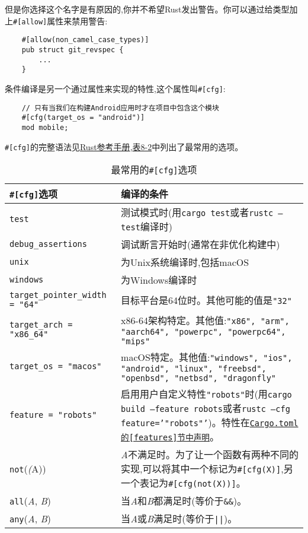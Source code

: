 但是你选择这个名字是有原因的,你并不希望Rust发出警告。你可以通过给类型加上\texttt{\#[allow]}属性来禁用警告:
\begin{verbatim}
    #[allow(non_camel_case_types)]
    pub struct git_revspec {
        ...
    }
\end{verbatim}

条件编译是另一个通过属性来实现的特性,这个属性叫\texttt{\#[cfg]}:
\begin{verbatim}
    // 只有当我们在构建Android应用时才在项目中包含这个模块
    #[cfg(target_os = "android")]
    mod mobile;
\end{verbatim}

\texttt{\#[cfg]}的完整语法见\href{https://doc.rust-lang.org/reference/conditional-compilation.html}{Rust参考手册},\hyperref[t8-2]{表8-2}中列出了最常用的选项。

\begin{table}[htbp]
    \centering
    \caption{最常用的\texttt{\#[cfg]}选项}
    \label{t8-2}
    \begin{tabular}{p{}p{}}
        \hline
        \textbf{\texttt{\#[cfg]}选项}   & \textbf{编译的条件} \\
        \hline
        \texttt{test}   & 测试模式时(用\texttt{cargo test}或者\texttt{rustc --test}编译时) \\
        \rowcolor{tablecolor}
        \texttt{debug\_assertions} & 调试断言开始时(通常在非优化构建中) \\
        \texttt{unix}   & 为Unix系统编译时,包括macOS \\
        \rowcolor{tablecolor}
        \texttt{windows}& 为Windows编译时 \\
        \texttt{target\_pointer\_width = "64"} & 目标平台是64位时。其他可能的值是\texttt{"32"} \\
        \rowcolor{tablecolor}
        \texttt{target\_arch = "x86\_64"} & x86-64架构特定。其他值:\texttt{"x86", "arm", "aarch64", "powerpc", "powerpc64", "mips"} \\
        \texttt{target\_os = "macos"} & macOS特定。其他值:\texttt{"windows", "ios", "android", "linux", "freebsd", "openbsd", "netbsd", "dragonfly"} \\
        \rowcolor{tablecolor}
        \texttt{feature = "robots"} & 启用用户自定义特性\texttt{"robots"}时(用\texttt{cargo build --feature robots}或者\texttt{rustc --cfg feature='"robots"'})。特性在\href{https://doc.rust-lang.org/cargo/reference/manifest.html}{\texttt{Cargo.toml的\texttt{[features]}节中声明}}。 \\
        \texttt{not}(\emph(A)) & \emph{A}不满足时。为了让一个函数有两种不同的实现,可以将其中一个标记为\texttt{\#[cfg(X)]},另一个表记为\texttt{\#[cfg(not(X))]}。 \\
        \rowcolor{tablecolor}
        \texttt{all}(\emph{A}, \emph{B}) & 当\emph{A}和\emph{B}都满足时(等价于\texttt{\&\&})。 \\
        \texttt{any}(\emph{A}, \emph{B}) & 当\emph{A}或\emph{B}满足时(等价于\texttt{||})。 \\
    \end{tabular}
\end{table}

